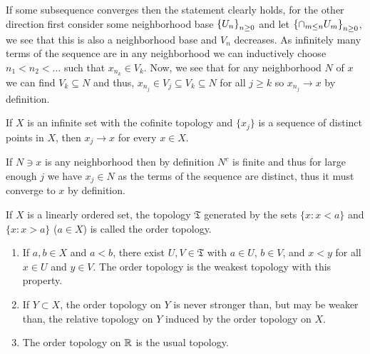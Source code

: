 \documentclass[12pt,a4paper]{article}
\begin{document}
\begin{solution}
    If some subsequence converges then the statement clearly holds, for the other direction first consider some neighborhood base $ \qty{ U_n}_{n\geq 0}$ and let $ \qty{\cap_{m\leq n}U_m}_{n\geq 0}$, we see that this is also a neighborhood base and $V_n$ decreases. 
    As infinitely many terms of the sequence are in any neighborhood we can inductively choose $n_1<n_2<\ldots$ such that $x_{n_k}\in V_k$. 
    Now, we see that for any neighborhood $N$ of $x$ we can find $V_k\subseteq N$ and thus, $x_{n_j}\in V_j\subseteq V_k\subseteq N$ for all $j\geq k$ so $x_{n_j}\to x$ by definition.
\end{solution}
\begin{problem}\label{prob:4-8}
If $X$ is an infinite set with the cofinite topology and $\{x_j\}$ is a sequence of distinct points in $X$, then $x_j \to x$ for every $x \in X$.
\end{problem}
\begin{solution}
If $N\ni x$ is any neighborhood then by definition $N^c$ is finite and thus for large enough $j$ we have $x_j\in N$ as the terms of the sequence are distinct, thus it must converge to $x$ by definition.
\end{solution}
\begin{problem}\label{prob:4-9}
If $X$ is a linearly ordered set, the topology $\mathfrak{T}$ generated by the sets $\{x : x < a\}$ and $\{x : x > a\}$ ($a \in X$) is called the order topology.
\begin{enumerate}[label=\alph*.]
    \item If $a, b \in X$ and $a < b$, there exist $U, V \in \mathfrak{T}$ with $a \in U$, $b \in V$, and $x < y$ for all $x \in U$ and $y \in V$. The order topology is the weakest topology with this property.
    \item If $Y \subset X$, the order topology on $Y$ is never stronger than, but may be weaker than, the relative topology on $Y$ induced by the order topology on $X$.
    \item The order topology on $\mathbb{R}$ is the usual topology.
\end{enumerate}
\end{problem}
\end{document}
